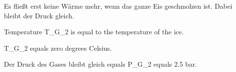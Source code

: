 Es fließt erst keine Wärme mehr, wenn das ganze Eis geschmolzen ist. Dabei bleibt der Druck gleich.

Temperature T_G_2 is equal to the temperature of the ice.

T_G_2 equals zero degrees Celsius.

Der Druck des Gases bleibt gleich equals P_G_2 equals 2.5 bar.